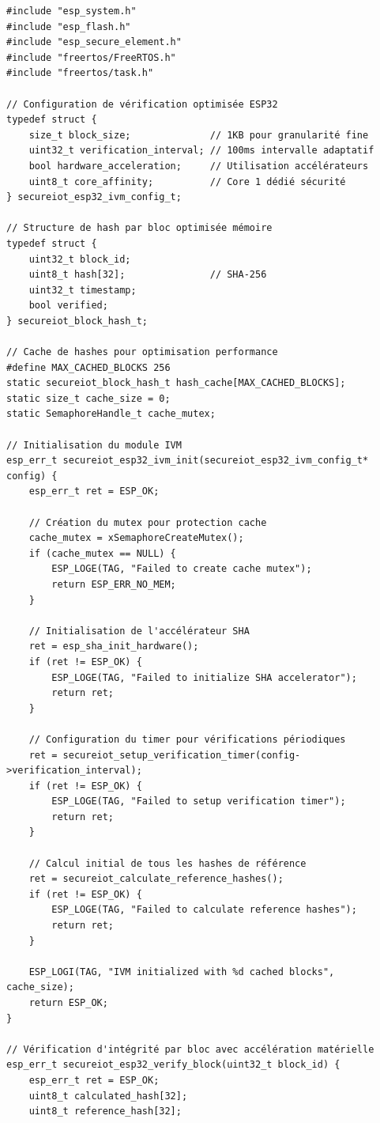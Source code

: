 \lstset{language=C}
\begin{lstlisting}[caption={Implémentation IVM optimisée ESP32}]
#include "esp_system.h"
#include "esp_flash.h"
#include "esp_secure_element.h"
#include "freertos/FreeRTOS.h"
#include "freertos/task.h"

// Configuration de vérification optimisée ESP32
typedef struct {
    size_t block_size;              // 1KB pour granularité fine
    uint32_t verification_interval; // 100ms intervalle adaptatif
    bool hardware_acceleration;     // Utilisation accélérateurs
    uint8_t core_affinity;          // Core 1 dédié sécurité
} secureiot_esp32_ivm_config_t;

// Structure de hash par bloc optimisée mémoire
typedef struct {
    uint32_t block_id;
    uint8_t hash[32];               // SHA-256
    uint32_t timestamp;
    bool verified;
} secureiot_block_hash_t;

// Cache de hashes pour optimisation performance
#define MAX_CACHED_BLOCKS 256
static secureiot_block_hash_t hash_cache[MAX_CACHED_BLOCKS];
static size_t cache_size = 0;
static SemaphoreHandle_t cache_mutex;

// Initialisation du module IVM
esp_err_t secureiot_esp32_ivm_init(secureiot_esp32_ivm_config_t* config) {
    esp_err_t ret = ESP_OK;
    
    // Création du mutex pour protection cache
    cache_mutex = xSemaphoreCreateMutex();
    if (cache_mutex == NULL) {
        ESP_LOGE(TAG, "Failed to create cache mutex");
        return ESP_ERR_NO_MEM;
    }
    
    // Initialisation de l'accélérateur SHA
    ret = esp_sha_init_hardware();
    if (ret != ESP_OK) {
        ESP_LOGE(TAG, "Failed to initialize SHA accelerator");
        return ret;
    }
    
    // Configuration du timer pour vérifications périodiques
    ret = secureiot_setup_verification_timer(config->verification_interval);
    if (ret != ESP_OK) {
        ESP_LOGE(TAG, "Failed to setup verification timer");
        return ret;
    }
    
    // Calcul initial de tous les hashes de référence
    ret = secureiot_calculate_reference_hashes();
    if (ret != ESP_OK) {
        ESP_LOGE(TAG, "Failed to calculate reference hashes");
        return ret;
    }
    
    ESP_LOGI(TAG, "IVM initialized with %d cached blocks", cache_size);
    return ESP_OK;
}

// Vérification d'intégrité par bloc avec accélération matérielle
esp_err_t secureiot_esp32_verify_block(uint32_t block_id) {
    esp_err_t ret = ESP_OK;
    uint8_t calculated_hash[32];
    uint8_t reference_hash[32];
    

\end{lstlisting}
